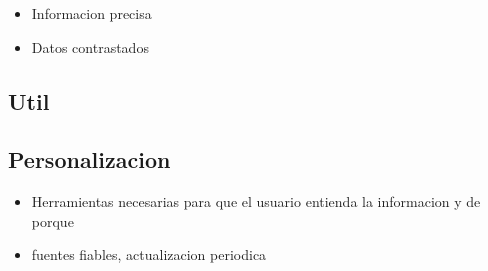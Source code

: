 \begin{itemize}

    \item Informacion precisa
    \item Datos contrastados
\end{itemize}

\subsection{Util}

\subsection{Personalizacion}

\begin{itemize}

      \item Herramientas necesarias para que el usuario entienda la informacion y de porque
 
    \item fuentes fiables, actualizacion periodica
\end{itemize}